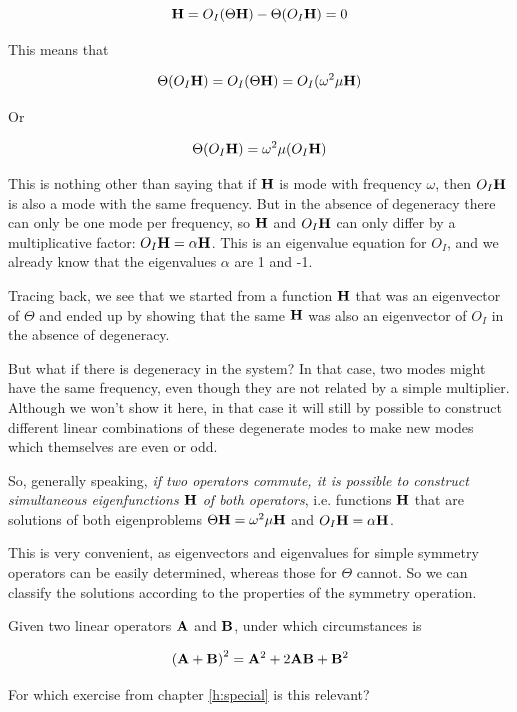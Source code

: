 \begin{equation}
[O_I, \Theta] {\bf H}= O_I(\Theta {\bf H}) - \Theta (O_I {\bf H} ) = 0
\end{equation} 

This means that

\begin{equation}
\Theta (O_I {\bf H} ) = O_I(\Theta {\bf H}) = O_I ( \omega^2 \mu {\bf H})
\end{equation} 

Or

\begin{equation}
\Theta (O_I {\bf H} ) =  \omega^2 \mu (O_I {\bf H})
\end{equation} 

This is nothing other than saying that if ${\bf H}$ is mode with frequency $\omega$, then $O_I {\bf H}$ is also a mode with the same frequency. But in the absence of degeneracy there can only be one mode per frequency, so ${\bf H}$ and $O_I {\bf H}$ can only differ by a multiplicative factor: $O_I {\bf H} = \alpha {\bf H}$. This is an eigenvalue equation for $O_I$, and we already know that the eigenvalues $\alpha$ are 1 and -1. 

Tracing back, we see that we started from a function ${\bf H}$ that was an eigenvector of $\Theta$ and ended up by showing that the same ${\bf H}$ was also an eigenvector of $O_I$ in the absence of degeneracy. 

But what if there is degeneracy in the system? In that case, two modes might have the same frequency, even though they are not related by a simple multiplier. Although we won't show it here, in that case it will still by possible to construct different linear combinations of these degenerate modes to make new modes which themselves are even or odd.

So, generally speaking, \emph{if two operators commute, it is possible to construct simultaneous eigenfunctions ${\bf H}$ of both operators}, i.e. functions ${\bf H}$ that are solutions of both eigenproblems $\Theta {\bf H} = \omega^2 \mu {\bf H}$ and $O_I {\bf H} = \alpha {\bf H}$.

This is very convenient, as eigenvectors and eigenvalues for simple symmetry operators can be easily determined, whereas those for $\Theta$ cannot. So we can classify the solutions according to the properties of the symmetry operation.

\begin{sidebar}
\begin{ex}
Given two linear operators $\bf A$ and $\bf B$, under which circumstances is

$$\left ( {\bf A} + {\bf B} \right ) ^2 =  {\bf A}^2 + 2 {\bf A}{\bf B}  + {\bf B}^2$$

For which exercise from chapter \ref{h:special} is this relevant?

\end{ex}
\end{sidebar}

